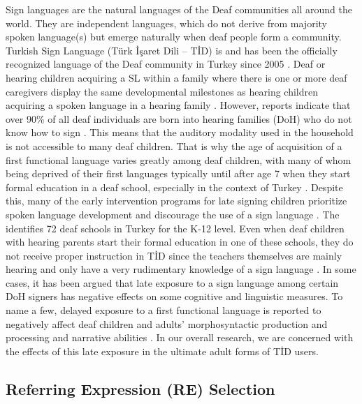 \documentclass[review]{elsarticle} %
\begin{document}
Sign languages are the natural languages of the Deaf communities all
around the world. They are independent languages, which do not derive
from majority spoken language(s) but emerge naturally when deaf people
form a community. Turkish Sign Language (Türk İşaret Dili -- TİD) is and
has been the officially recognized language of the Deaf community in
Turkey since 2005 \citep[see][ for a brief review of the historical
development of the language]{nuhbalaoglu2018}. Deaf or hearing children
acquiring a SL within a family where there is one or more deaf
caregivers display the same developmental milestones as hearing children
acquiring a spoken language in a hearing family
\citep{chamberlain_language_1999, meier1990}. However, reports indicate
that over 90\% of all deaf individuals are born into hearing families
(DoH) who do not know how to sign \citep{woll2013}. This means that the
auditory modality used in the household is not accessible to many deaf
children. That is why the age of acquisition of a first functional
language varies greatly among deaf children, with many of whom being
deprived of their first languages typically until after age 7 when they
start formal education in a deaf school, especially in the context of
Turkey \citep{sari_analysis_2005}. Despite this, many of the early
intervention programs for late signing children prioritize spoken
language development and discourage the use of a sign language
\citep{kemaloglu2012}. The \citet{ministryofnationaleducation2020}
identifies 72 deaf schools in Turkey for the K-12 level. Even when deaf
children with hearing parents start their formal education in one of
these schools, they do not receive proper instruction in TİD since the
teachers themselves are mainly hearing and only have a very rudimentary
knowledge of a sign language \citep{ilkbasaran2015, sari_analysis_2005}.
In some cases, it has been argued that late exposure to a sign language
among certain DoH signers has negative effects on some cognitive and
linguistic measures. To name a few, delayed exposure to a first
functional language is reported to negatively affect deaf children and
adults' morphosyntactic production and processing
\citep{kayaba2022, boudreault2006, newport1990, cheng2021, karadoller2017, cormier2012}
and narrative abilities \citep[e.g.,][]{becker2009}. In our overall
research, we are concerned with the effects of this late exposure in the
ultimate adult forms of TİD users.

\hypertarget{referring-expression-re-selection}{%
\subsection{Referring Expression (RE)
Selection}\label{referring-expression-re-selection}}
\end{document}
